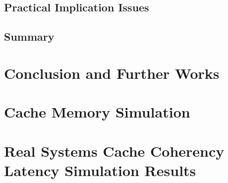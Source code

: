 \documentclass[medieteknikk]{gucmasterthesis}
\begin{document}
\section{Practical Implication Issues}
\section{Summary}
\chapter{Conclusion and Further Works}






\appendix

\chapter{Cache Memory Simulation}
\chapter{Real Systems Cache Coherency Latency Simulation Results}
\end{document}
